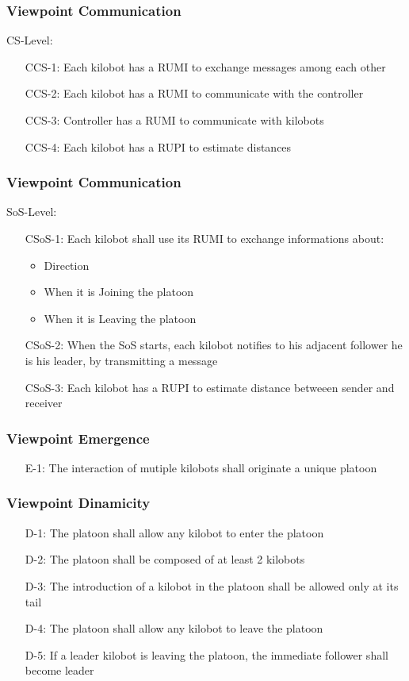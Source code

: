 \documentclass{beamer}
\begin{document}
\begin{frame}
\frametitle{Viewpoint Communication}
CS-Level:

\begin{enumerate}[align=left]
	\item[CCS-1:] Each kilobot has a RUMI to exchange messages among each other
	\item[CCS-2:] Each kilobot has a RUMI to communicate with the controller
	\item[CCS-3:] Controller has a RUMI to communicate with kilobots
	\item[CCS-4:] Each kilobot has a RUPI to estimate distances
\end{enumerate}
\end{frame}

\begin{frame}
\frametitle{Viewpoint Communication}
SoS-Level:

\begin{enumerate}[align=left]
	\item[CSoS-1:] Each kilobot shall use its RUMI to exchange informations about:
	\begin{itemize}
		\item Direction
		\item When it is Joining the platoon
		\item When it is Leaving the platoon
	\end{itemize}
	\item[CSoS-2:] When the SoS starts, each kilobot notifies to his adjacent follower he is his leader, by transmitting a message
	\item[CSoS-3:] Each kilobot has a RUPI to estimate distance betweeen sender and receiver
\end{enumerate}
\end{frame}

\begin{frame}
\frametitle{Viewpoint Emergence}
\begin{enumerate}[align=left]
	\item[E-1:] The interaction of mutiple kilobots shall originate a unique platoon
\end{enumerate}
\end{frame}

\begin{frame}
\frametitle{Viewpoint Dinamicity}
\begin{enumerate}[align=left]
	\item[D-1:] The platoon shall allow any kilobot to enter the platoon
	\item[D-2:] The platoon shall be composed of at least 2 kilobots
	\item[D-3:] The introduction of a kilobot in the platoon shall be allowed only at its tail
	\item[D-4:] The platoon shall allow any kilobot to leave the platoon
	\item[D-5:] If a leader kilobot is leaving the platoon, the immediate follower shall become leader
\end{enumerate}
\end{frame}
\end{document}
